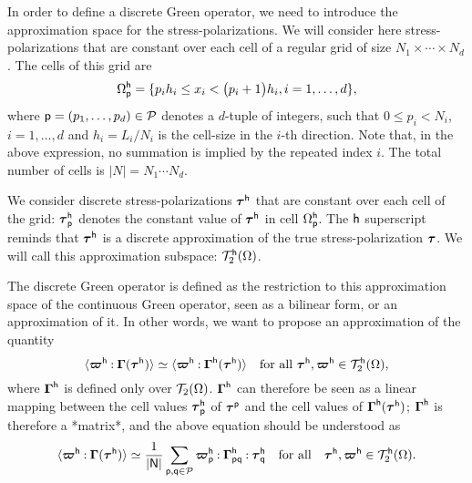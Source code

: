In order to define a discrete Green operator, we need to introduce the
approximation space for the stress-polarizations. We will consider here
stress-polarizations that are constant over each cell of a regular grid of size
\(N_1\times\cdots\times N_d\). The cells of this grid are
\begin{equation}
  \Omega_{\mathsf{p}}^{\mathsf{h}}=\{p_ih_i\leq x_i<\bigl(p_i+1\bigr)h_i, i=1,\ldots, d\},
\end{equation}
where \(\mathsf{p}=(p_1,\ldots,p_d)\in\mathcal{P}\) denotes a \(d\)-tuple of
integers, such that \(0\leq p_i<N_i\), \(i=1,\ldots, d\) and \(h_i=L_i/N_i\) is
the cell-size in the \(i\)-th direction. Note that, in the above expression, no
summation is implied by the repeated index \(i\). The total number of cells is
\(\lvert N\rvert=N_1\cdots N_d\).

We consider discrete stress-polarizations \(\boldsymbol\tau^{\mathsf{h}}\) that are
constant over each cell of the grid: \(\boldsymbol\tau_{\mathsf{p}}^{\mathsf{h}}\)
denotes the constant value of \(\boldsymbol\tau^{\mathsf{h}}\) in cell
\(\Omega_{\mathsf{p}}^{\mathsf{h}}\). The \(\mathsf{h}\) superscript reminds that
\(\boldsymbol\tau^{\mathsf{h}}\) is a discrete approximation of the true
stress-polarization \(\boldsymbol\tau\). We will call this approximation subspace:
\(\mathcal T_2^{\mathsf{h}}(\Omega)\).

The discrete Green operator is defined as the restriction to this approximation
space of the continuous Green operator, seen as a bilinear form, or an
approximation of it. In other words, we want to propose an approximation of the
quantity
\begin{equation}
  \langle\boldsymbol\varpi^{\mathsf{h}}\mathbin{\mathord{:}}\boldsymbol\Gamma(\boldsymbol\tau^{\mathsf{h}})\rangle
  \simeq\langle\boldsymbol\varpi^{\mathsf{h}}\mathbin{\mathord{:}}\boldsymbol\Gamma^{\mathsf{h}}(\boldsymbol
  \tau^{\mathsf{h}})\rangle\quad\text{for all }\boldsymbol\tau^{\mathsf{h}},
  \boldsymbol\varpi^{\mathsf{h}}\in\mathcal T_2^{\mathsf{h}}(\Omega),
\end{equation}
where \(\boldsymbol\Gamma^{\mathsf{h}}\) is defined only over
\(\mathcal T_2(\Omega)\). \(\boldsymbol\Gamma^{\mathsf{h}}\) can therefore be seen as a
linear mapping between the cell values \(\boldsymbol\tau_{\mathsf{p}}^{\mathsf{h}}\) of
\(\boldsymbol\tau^{\mathsf{p}}\) and the cell values of
\(\boldsymbol\Gamma^{\mathsf{h}}(\boldsymbol\tau^{\mathsf{h}})\); \(\boldsymbol\Gamma^{\mathsf{h}}\)
is therefore a *matrix*, and the above equation should be understood as
\begin{equation}
  \label{eq:20210928054147}
  \langle\boldsymbol\varpi^{\mathsf{h}}\mathbin{\mathord{:}}\boldsymbol\Gamma(\boldsymbol\tau^{\mathsf{h}})\rangle
  \simeq\frac1{\lvert\mathsf{N}\rvert}\sum_{\mathsf{p}, \mathsf{q}\in\mathcal{P}}
  \boldsymbol\varpi_{\mathsf{p}}^{\mathsf{h}}\mathbin{\mathord{:}}
  \boldsymbol\Gamma_{\mathsf{p}\mathsf{q}}^{\mathsf{h}}\mathbin{\mathord{:}}\boldsymbol
  \tau_{\mathsf{q}}^{\mathsf{h}}
  \quad\text{for all}\quad
  \boldsymbol\tau^{\mathsf{h}},\boldsymbol\varpi^{\mathsf{h}}\in\mathcal T_2^{\mathsf{h}}(\Omega).
\end{equation}

